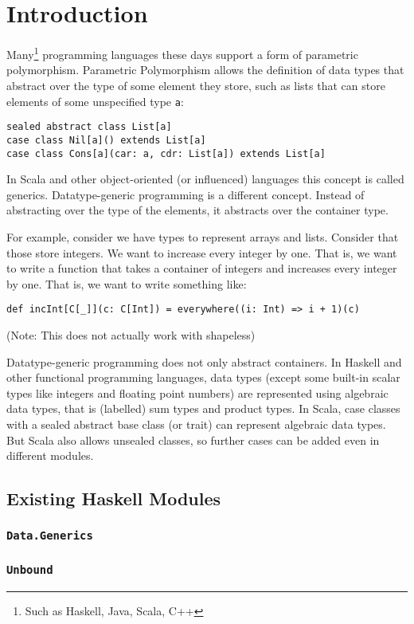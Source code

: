 \chapter{Introduction}

Many\footnote{Such as Haskell, Java, Scala, C++} programming languages these days support a form of parametric polymorphism.
Parametric Polymorphism allows the definition of data types that abstract over
the type of some element they store, such as lists that can store elements of
some unspecified type \lstinline{a}:
\begin{lstlisting}
sealed abstract class List[a]
case class Nil[a]() extends List[a]
case class Cons[a](car: a, cdr: List[a]) extends List[a]
\end{lstlisting}
In Scala and other object-oriented (or influenced) languages this concept is
called generics.
Datatype-generic programming is a different concept. Instead of abstracting
over the type of the elements, it abstracts over the container type.

For example, consider we have types to represent arrays and lists. Consider that
those store integers. We want to increase every integer by one. That is, we want
to write a function that takes a container of integers and increases every integer
by one. That is, we want to write something like:

\begin{lstlisting}
def incInt[C[_]](c: C[Int]) = everywhere((i: Int) => i + 1)(c)
\end{lstlisting}
(Note: This does not actually work with shapeless)

Datatype-generic programming does not only abstract containers. In Haskell and
other functional programming languages, data types (except some built-in scalar
types like integers and floating point numbers) are represented using
algebraic data types, that is (labelled) sum types and product types.
In Scala, case classes with a sealed abstract base class (or trait) can
represent algebraic data types.\cite{scalagp}
But Scala also allows unsealed classes, so further cases can be added even in
different modules.


\section{Existing Haskell Modules}
\subsection{\texttt{Data.Generics}}
\subsection{\texttt{Unbound}}

\cite{DBLP:conf/tldi/LammelJ03}
